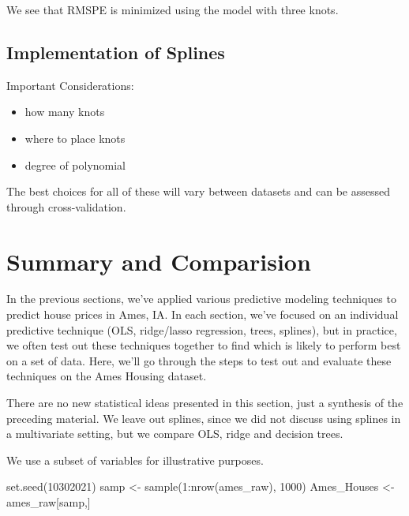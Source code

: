 \documentclass[
  letterpaper,
  DIV=11,
  numbers=noendperiod]{scrreprt}
\newenvironment{Shaded}{\begin{snugshade}}{\end{snugshade}}
\newcommand{\DecValTok}[1]{\textcolor[rgb]{0.68,0.00,0.00}{#1}}
\newcommand{\FunctionTok}[1]{\textcolor[rgb]{0.28,0.35,0.67}{#1}}
\newcommand{\NormalTok}[1]{\textcolor[rgb]{0.00,0.23,0.31}{#1}}
\newcommand{\OtherTok}[1]{\textcolor[rgb]{0.00,0.23,0.31}{#1}}
\newcommand{\SpecialCharTok}[1]{\textcolor[rgb]{0.37,0.37,0.37}{#1}}
\providecommand{\tightlist}{%
  \setlength{\itemsep}{0pt}\setlength{\parskip}{0pt}}\usepackage{longtable,booktabs,array}
\begin{document}
We see that RMSPE is minimized using the model with three knots.

\subsection{Implementation of Splines}\label{implementation-of-splines}

Important Considerations:

\begin{itemize}
\tightlist
\item
  how many knots\\
\item
  where to place knots\\
\item
  degree of polynomial
\end{itemize}

The best choices for all of these will vary between datasets and can be
assessed through cross-validation.

\section{Summary and Comparision}\label{summary-and-comparision}

In the previous sections, we've applied various predictive modeling
techniques to predict house prices in Ames, IA. In each section, we've
focused on an individual predictive technique (OLS, ridge/lasso
regression, trees, splines), but in practice, we often test out these
techniques together to find which is likely to perform best on a set of
data. Here, we'll go through the steps to test out and evaluate these
techniques on the Ames Housing dataset.

There are no new statistical ideas presented in this section, just a
synthesis of the preceding material. We leave out splines, since we did
not discuss using splines in a multivariate setting, but we compare OLS,
ridge and decision trees.

We use a subset of variables for illustrative purposes.

\begin{Shaded}
\begin{Highlighting}[]
\FunctionTok{set.seed}\NormalTok{(}\DecValTok{10302021}\NormalTok{)}
\NormalTok{samp }\OtherTok{\textless{}{-}} \FunctionTok{sample}\NormalTok{(}\DecValTok{1}\SpecialCharTok{:}\FunctionTok{nrow}\NormalTok{(ames\_raw), }\DecValTok{1000}\NormalTok{)}
\NormalTok{Ames\_Houses }\OtherTok{\textless{}{-}}\NormalTok{ ames\_raw[samp,]}
\end{Highlighting}
\end{Shaded}
\end{document}
